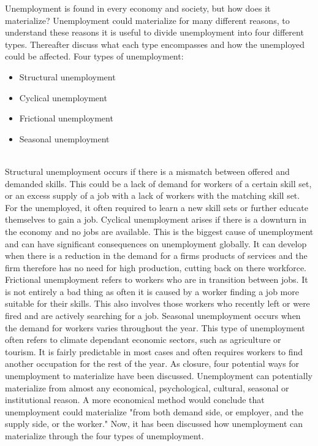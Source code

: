 Unemployment is found in every economy and society, but how does it materialize?
Unemployment could materialize for many different reasons, to understand these reasons it is useful to divide unemployment into four different types.
Thereafter discuss what each type encompasses and how the unemployed could be affected.
Four types of unemployment: \\
\begin{itemize}
   \item  Structural unemployment
   \item  Cyclical unemployment
   \item  Frictional unemployment
   \item  Seasonal unemployment
\end{itemize} \cite{Four_types_of_unemployment} \\
Structural unemployment occurs if there is a mismatch between offered and demanded skills.
This could be a lack of demand for workers of a certain skill set, or an excess supply of a job with a lack of workers with the matching skill set.
For the unemployed, it often required to learn a new skill sets or further educate themselves to gain a job.
Cyclical unemployment arises if there is a downturn in the economy and no jobs are available.
This is the biggest cause of unemployment and can have significant consequences on unemployment globally. \cite{Understanding_four_types_of_unemployment}
It can develop when there is a reduction in the demand for a firms products of services and the firm therefore has no need for high production, cutting back on there workforce. 
Frictional unemployment refers to workers who are in transition between jobs. 
It is not entirely a bad thing as often it is caused by a worker finding a job more suitable for their skills.
This also involves those workers who recently left or were fired and are actively searching for a job.
Seasonal unemployment occurs when the demand for workers varies throughout the year.
This type of unemployment often refers to climate dependant economic sectors, such as agriculture or tourism.
It is fairly predictable in most cases and often requires workers to find another occupation for the rest of the year. 
As closure, four potential ways for unemployment to materialize have been discussed.
Unemployment can potentially materialize from almost any economical, psychological, cultural, seasonal or institutional reason. 
A more economical method would conclude that unemployment could materialize "from both demand side, or employer, and the supply side, or the worker." \cite{Economical_theory_behind_unemployment}
Now, it has been discussed how unemployment can materialize through the four types of unemployment. \cite{Guide_to_unemployment}   \\


